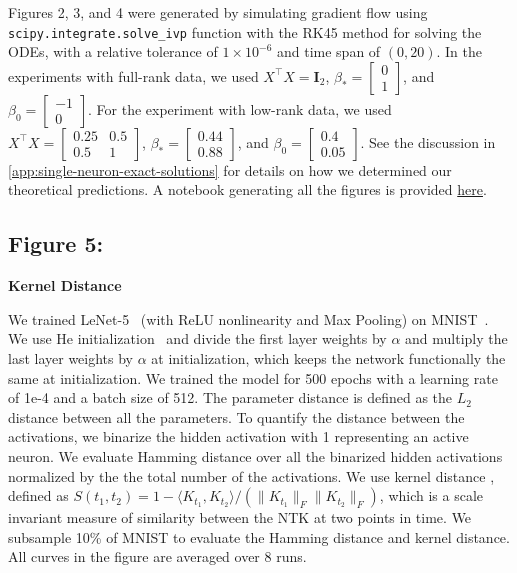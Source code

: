 \documentclass{article}
\theoremstyle{plain}
\theoremstyle{definition}
\theoremstyle{remark}
\begin{document}
Figures 2, 3, and 4 were generated by simulating gradient flow using  \texttt{scipy.integrate.solve\_ivp} function with the RK45 method for solving the ODEs, with a relative tolerance of $1 \times 10^{-6}$ and time span of $(0,20)$.
%
In the experiments with full-rank data, we used $X^\intercal X = \mathbf{I}_2$, $\beta_* = \left[\begin{smallmatrix} 0 \\ 1 \end{smallmatrix}\right]$, and $\beta_0 = \left[\begin{smallmatrix} -1 \\ 0 \end{smallmatrix}\right]$. 
%
For the experiment with low-rank data, we used $X^\intercal X = \left[\begin{smallmatrix} 0.25 & 0.5 \\ 0.5 & 1 \end{smallmatrix}\right]$, $\beta_* = \left[\begin{smallmatrix} 0.44 \\ 0.88 \end{smallmatrix}\right]$, and $\beta_0 = \left[\begin{smallmatrix} 0.4 \\ 0.05 \end{smallmatrix}\right]$.
%
See the discussion in \cref{app:single-neuron-exact-solutions} for details on how we determined our theoretical predictions.
%
A notebook generating all the figures is provided \href{https://github.com/allanraventos/getrichquick/blob/main/single-neuron/Single_Neuron.ipynb}{here}.


\subsection{Figure 5: }
\label{app:fig-5}

\textbf{Kernel Distance}

We trained LeNet-5~\cite{lecun1998gradient} (with ReLU nonlinearity and Max Pooling) on MNIST~\cite{lecun1998gradient}. We use He initialization~\cite{he2015delving} and divide the first layer weights by $\alpha$ and multiply the last layer weights by $\alpha$ at initialization, which keeps the network functionally the same at initialization. We trained the model for 500 epochs with a learning rate of 1e-4 and a batch size of 512. The parameter distance is defined as the $L_2$ distance between all the parameters. To quantify the distance between the activations, we binarize the hidden activation with 1 representing an active neuron. We evaluate Hamming distance over all the binarized hidden activations normalized by the the total number of the activations. We use kernel distance \cite{fort2020deep}, defined as
$S(t_1,t_2) = 1 - \langle K_{t_1}, K_{t_2}\rangle / \left(\|K_{t_1}\|_F\|K_{t_2}\|_F\right)$, which is a scale invariant measure of similarity between the NTK at two points in time. We subsample 10\% of MNIST to evaluate the Hamming distance and kernel distance. All curves in the figure are averaged over 8 runs.
\end{document}
